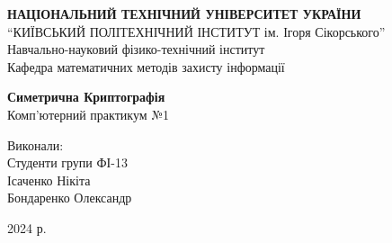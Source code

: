 \pagestyle{empty}

\begin{titlepage}
    \begin{center}

        \textbf{НАЦІОНАЛЬНИЙ ТЕХНІЧНИЙ УНІВЕРСИТЕТ УКРАЇНИ}\\
        “КИЇВСЬКИЙ ПОЛІТЕХНІЧНИЙ ІНСТИТУТ ім. Ігоря Сікорського”\\
        Навчально-науковий фізико-технічний інститут\\
        Кафедра математичних методів захисту інформації

        \vspace{6cm}

        \Large \textbf{Симетрична Криптографія}\\
        Комп'ютерний практикум №1

    \end{center}

    \vspace{9cm}
    \begin{flushright}
        Виконали:\\
        Студенти групи ФІ-13\\
        Ісаченко Нікіта\\
        Бондаренко Олександр
    \end{flushright}

    \vspace*{3cm}

    \begin{center}
        2024 р.
    \end{center}
\end{titlepage}